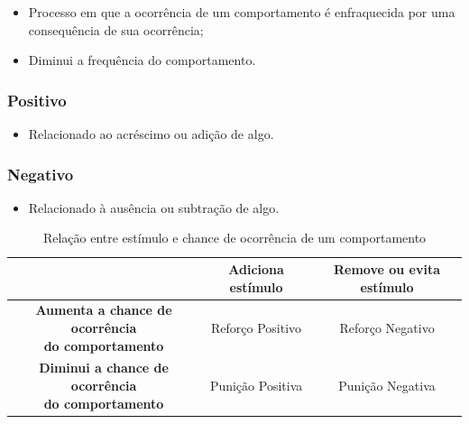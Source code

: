 \documentclass{article}
\begin{document}
            \begin{itemize}
                \item Processo em que a ocorrência de um comportamento é enfraquecida por uma consequência de sua ocorrência;
                \item Diminui a frequência do comportamento.
            \end{itemize}
            
        \subsubsection{Positivo}
        
            \begin{itemize}
                \item Relacionado ao acréscimo ou adição de algo.
            \end{itemize}
        
        \subsubsection{Negativo}

            \begin{itemize}
                \item Relacionado à ausência ou subtração de algo.
            \end{itemize}
        
        \begin{table}[ht]
            \centering
            \begin{tabular}{|c|c|c|}
                \hline
                 & \textbf{Adiciona estímulo} & \textbf{Remove ou evita estímulo} \\
                \hline
                \makecell{\textbf{Aumenta a chance de ocorrência} \\ \textbf{do comportamento}} & Reforço Positivo & Reforço Negativo \\ 
                \hline
                \makecell{\textbf{Diminui a chance de ocorrência} \\ \textbf{do comportamento}} & Punição Positiva & Punição Negativa \\ 
                \hline
            \end{tabular}
            \caption{Relação entre estímulo e chance de ocorrência de um comportamento}
            \label{tab:reforco-punicao}
        \end{table}
        
\end{document}
